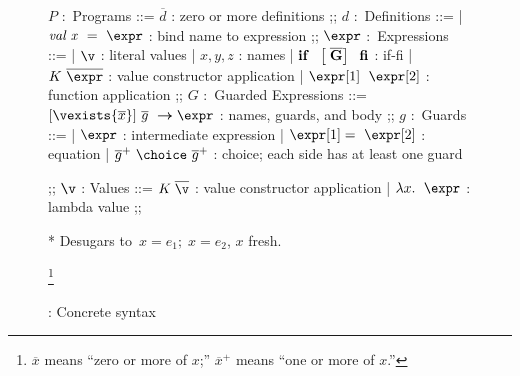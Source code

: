 \documentclass[runningheads]{llncs}
\begin{document}
        

    \begin{figure}[t]
      \scriptsize
          \begin{center}
            \begin{bnf}
            $P$ :~\textsf{Programs} ::=
            $\overline{d} $ : zero or more definitions
            ;;
            $d$ :~\textsf{Definitions} ::=
            | $\it{val}\; x\;~\it{=}\;~\expr$ : bind name to expression
            ;;
            $\expr$ :~\textsf{Expressions} ::=
            | $\v$ : literal values 
            | $x, y, z$ : names
            | $\bf{if}\;~\left[\; \overline{G}\right]\;~\bf{fi}$ : if-fi 
            | $K~\overline{\expr}$ : value constructor application 
            | $\expr[1]\;~\expr[2]$ : function application 
            ;;
            $G$ :~\textsf{Guarded Expressions} ::=  
            $[\vexists{\overline{x}}]~\overline{g}~\boldsymbol{\rightarrow}\expr$ : names, guards, and body
            ;;
            $g$ :~\textsf{Guards} ::=  
            | $\expr$ : intermediate expression 
            | $\expr[1] =~\expr[2]$ : equation 
            | $ \overline{g}^{+}~\choice~\overline{g}^{+}$ : choice; each side has at least one guard 

            ;;
            $\v$ : Values ::= $K\;\overline{\v}$ : value constructor application 
            | $\lambda x.\;~\expr$ : lambda value
            ;;
            \end{bnf}
            \medskip
          
          * Desugars to~{$x = e_{1};\; x = e_{2}$}, $x$ fresh. %
          \end{center}
          \caption{\VMinus: Concrete syntax}\footnote{$\overline{x}$ means ``zero or more of $x$;''
          $\overline{x}^{+}$ means ``one or more of $x$.''}
          \label{fig:vmsyntax}
        \end{figure}
\end{document}
